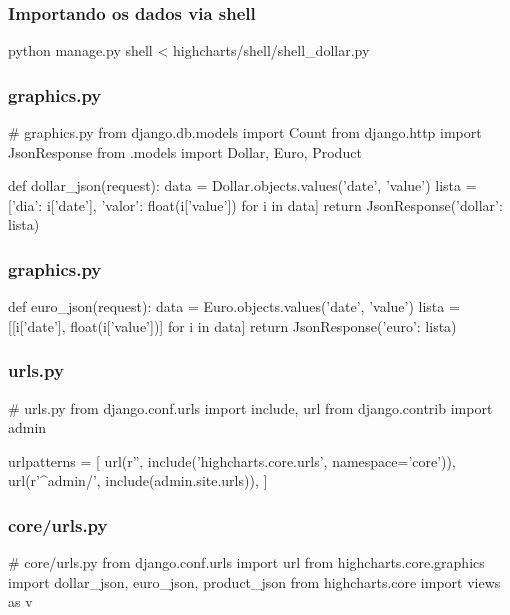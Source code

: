 \documentclass[aspectratio=169]{beamer}
\begin{document}
{\begin{frame}[fragile]\frametitle{Importando os dados via shell}

\begin{bashcode}
python manage.py shell < highcharts/shell/shell_dollar.py
\end{bashcode}

\end{frame}

\begin{frame}[fragile]\frametitle{graphics.py}

\begin{pythoncode}
# graphics.py
from django.db.models import Count
from django.http import JsonResponse
from .models import Dollar, Euro, Product


def dollar_json(request):
    data = Dollar.objects.values('date', 'value')
    lista = [{'dia': i['date'], 
              'valor': float(i['value'])} for i in data]
    return JsonResponse({'dollar': lista})
\end{pythoncode}

\end{frame}

\begin{frame}[fragile]\frametitle{graphics.py}

\begin{pythoncode}
def euro_json(request):
    data = Euro.objects.values('date', 'value')
    lista = [[i['date'], float(i['value'])] for i in data]
    return JsonResponse({'euro': lista})
\end{pythoncode}

\end{frame}

\begin{frame}[fragile]\frametitle{urls.py}

\begin{pythoncode}
# urls.py
from django.conf.urls import include, url
from django.contrib import admin

urlpatterns = [
    url(r'', include('highcharts.core.urls', namespace='core')),
    url(r'^admin/', include(admin.site.urls)),
]
\end{pythoncode}

\end{frame}

\begin{frame}[fragile]\frametitle{core/urls.py}

\begin{pythoncode}
# core/urls.py
from django.conf.urls import url
from highcharts.core.graphics import dollar_json, euro_json, product_json
from highcharts.core import views as v


\end{pythoncode}
\end{frame}}
\end{document}
